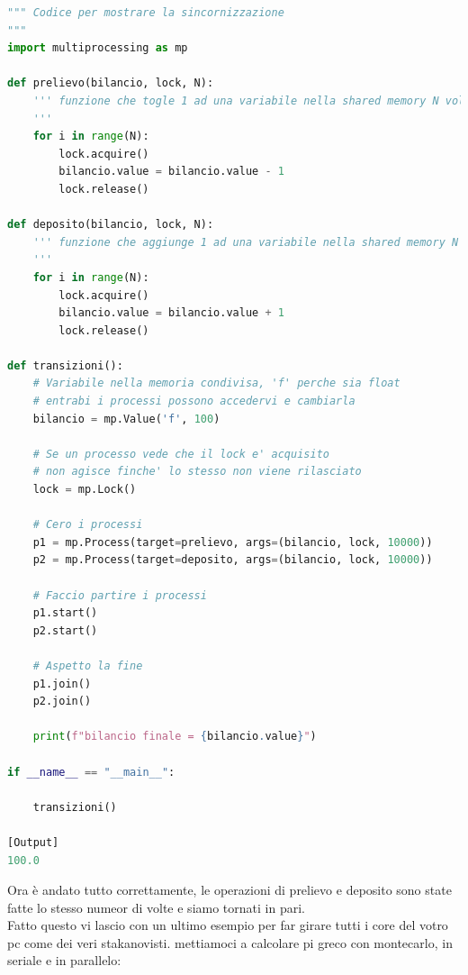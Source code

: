 \documentclass[10pt,a4paper]{article}
\begin{document}
\begin{lstlisting}[language=Python]
""" Codice per mostrare la sincornizzazione
"""
import multiprocessing as mp

def prelievo(bilancio, lock, N):
    ''' funzione che togle 1 ad una variabile nella shared memory N volte
    '''
    for i in range(N):
        lock.acquire()
        bilancio.value = bilancio.value - 1
        lock.release()

def deposito(bilancio, lock, N):
    ''' funzione che aggiunge 1 ad una variabile nella shared memory N volte
    '''
    for i in range(N):
        lock.acquire()
        bilancio.value = bilancio.value + 1
        lock.release()

def transizioni():
    # Variabile nella memoria condivisa, 'f' perche sia float
    # entrabi i processi possono accedervi e cambiarla
    bilancio = mp.Value('f', 100)

    # Se un processo vede che il lock e' acquisito
    # non agisce finche' lo stesso non viene rilasciato
    lock = mp.Lock()

    # Cero i processi
    p1 = mp.Process(target=prelievo, args=(bilancio, lock, 10000))
    p2 = mp.Process(target=deposito, args=(bilancio, lock, 10000))

    # Faccio partire i processi
    p1.start()
    p2.start()

    # Aspetto la fine
    p1.join()
    p2.join()

    print(f"bilancio finale = {bilancio.value}")

if __name__ == "__main__":
    
    transizioni()

[Output]
100.0
\end{lstlisting}
Ora è andato tutto correttamente, le operazioni di prelievo e deposito sono state fatte lo stesso numeor di volte e siamo tornati in pari.\\
Fatto questo vi lascio con un ultimo esempio per far girare tutti i core del votro pc come dei veri stakanovisti. mettiamoci a calcolare pi greco con montecarlo, in seriale e in parallelo:
\end{document}
